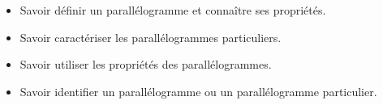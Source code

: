 \begin{myobj}
	\begin{itemize}
		
		\item Savoir définir un parallélogramme et connaître ses propriétés.
		\item Savoir caractériser les parallélogrammes particuliers.
		\item Savoir utiliser les propriétés des parallélogrammes.
		\item Savoir identifier un parallélogramme ou un parallélogramme particulier.
			
	\end{itemize}
\end{myobj}

%
%		


